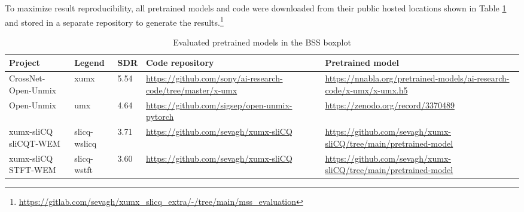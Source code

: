 \documentclass[report.tex]{subfiles}
\begin{document}
To maximize result reproducibility, all pretrained models and code were downloaded from their public hosted locations shown in Table \ref{table:bsseval} and stored in a separate repository to generate the results.\footnote{\url{https://gitlab.com/sevagh/xumx_slicq_extra/-/tree/main/mss_evaluation}}

\begin{table}[ht]
	\centering
	\caption{Evaluated pretrained models in the BSS boxplot}
	\label{table:bsseval}
	\begin{tabular}{ |p{2.5cm}|l|l|p{3.5cm}|p{3.5cm}| }
	 \hline
		Project & Legend & SDR & Code repository & Pretrained model \\
	 \hline
	 \hline
		CrossNet-Open-Unmix & xumx & 5.54 & \url{https://github.com/sony/ai-research-code/tree/master/x-umx} & \url{https://nnabla.org/pretrained-models/ai-research-code/x-umx/x-umx.h5} \\
	 \hline
		Open-Unmix & umx & 4.64 & \url{https://github.com/sigsep/open-unmix-pytorch} & \url{https://zenodo.org/record/3370489} \\
	 \hline
		\makecell[l]{xumx-sliCQ \\ sliCQT-WEM} & slicq-wslicq & 3.71 & \url{https://github.com/sevagh/xumx-sliCQ} & \url{https://github.com/sevagh/xumx-sliCQ/tree/main/pretrained-model} \\
	 \hline
		\makecell[l]{xumx-sliCQ \\ STFT-WEM} & slicq-wstft & 3.60 & \url{https://github.com/sevagh/xumx-sliCQ} & \url{https://github.com/sevagh/xumx-sliCQ/tree/main/pretrained-model} \\
	 \hline
\end{tabular}
\end{table}
\end{document}
